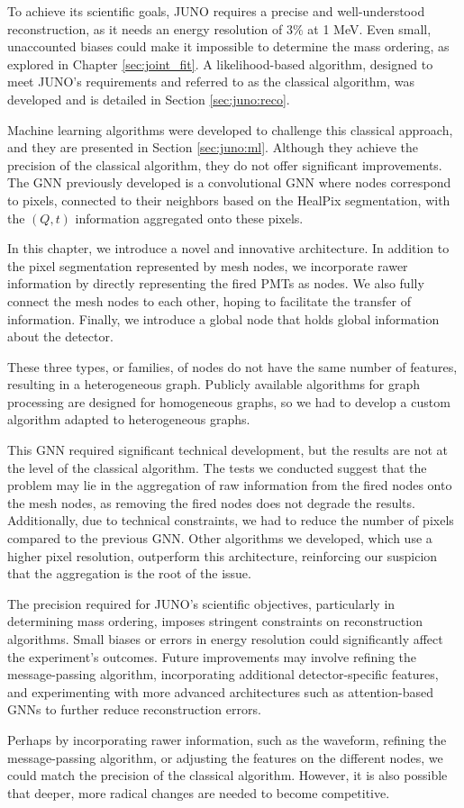 \documentclass[../main.tex]{subfiles}
\begin{document}
To achieve its scientific goals, JUNO requires a precise and well-understood reconstruction, as it needs an energy resolution of $3\%$ at 1 MeV. Even small, unaccounted biases could make it impossible to determine the mass ordering, as explored in Chapter \ref{sec:joint_fit}. A likelihood-based algorithm, designed to meet JUNO's requirements and referred to as the classical algorithm, was developed and is detailed in Section \ref{sec:juno:reco}.

Machine learning algorithms were developed to challenge this classical approach, and they are presented in Section \ref{sec:juno:ml}. Although they achieve the precision of the classical algorithm, they do not offer significant improvements. The GNN previously developed is a convolutional GNN where nodes correspond to pixels, connected to their neighbors based on the HealPix \cite{gorski_healpix_2005} segmentation, with the $(Q, t)$ information aggregated onto these pixels.

In this chapter, we introduce a novel and innovative architecture. In addition to the pixel segmentation represented by mesh nodes, we incorporate rawer information by directly representing the fired PMTs as nodes. We also fully connect the mesh nodes to each other, hoping to facilitate the transfer of information. Finally, we introduce a global node that holds global information about the detector.

These three types, or families, of nodes do not have the same number of features, resulting in a heterogeneous graph. Publicly available algorithms for graph processing are designed for homogeneous graphs, so we had to develop a custom algorithm adapted to heterogeneous graphs.

This GNN required significant technical development, but the results are not at the level of the classical algorithm. The tests we conducted suggest that the problem may lie in the aggregation of raw information from the fired nodes onto the mesh nodes, as removing the fired nodes does not degrade the results. Additionally, due to technical constraints, we had to reduce the number of pixels compared to the previous GNN. Other algorithms we developed, which use a higher pixel resolution, outperform this architecture, reinforcing our suspicion that the aggregation is the root of the issue.

The precision required for JUNO's scientific objectives, particularly in determining mass ordering, imposes stringent constraints on reconstruction algorithms. Small biases or errors in energy resolution could significantly affect the experiment's outcomes. Future improvements may involve refining the message-passing algorithm, incorporating additional detector-specific features, and experimenting with more advanced architectures such as attention-based GNNs to further reduce reconstruction errors.

Perhaps by incorporating rawer information, such as the waveform, refining the message-passing algorithm, or adjusting the features on the different nodes, we could match the precision of the classical algorithm. However, it is also possible that deeper, more radical changes are needed to become competitive.
\end{document}
